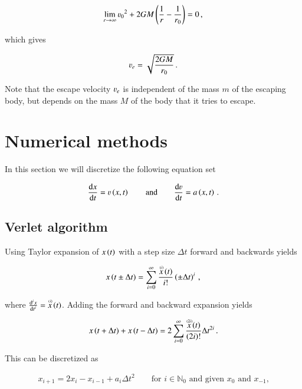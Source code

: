 \documentclass[11pt,english,a4paper]{article}
\begin{document}
\begin{flushleft}
\begin{align*}
\lim_{r\to \infty}{\varv_0}^2 + 2GM\p{\frac{1}{r}-\frac{1}{r_0}} = 0 \,, 
\end{align*}

which gives

\begin{align}
\varv_e = \sqrt{\frac{2GM}{r_0}}\,.
\label{eq_2}
\end{align}

Note that the escape velocity $\varv_e$ is independent of the mass $m$ of the escaping body, but depends on the mass $M$ of the body that it tries to escape. 

\section{Numerical methods}

In this section we will discretize the following equation set

\begin{align}
\frac{\mathrm{d}x}{\mathrm{d}t} = \varv\p{x,t} \qquad \text{and} \qquad \frac{\mathrm{d}\varv}{\mathrm{d}t} = a\p{x,t} \,.
\label{eq_3}
\end{align}

\subsection{Verlet algorithm}

Using Taylor expansion of $x\p{t}$ with a step size $\Delta t$ forward and backwards yields

\begin{align}
x\p{t\pm\Delta t} = \sum_{i=0}^{\infty} \frac{\T{x}{(i)}\p{t}}{i!}\p{\pm\Delta t}^i \,,
\label{eq_4}
\end{align}

where $\frac{\mathrm{d}^i x}{\mathrm{d}t^i} = \T{x}{(i)}\p{t}$. Adding the forward and backward expansion yields

\begin{align*}
x\p{t+\Delta t} + x\p{t-\Delta t} = 2\sum_{i=0}^{\infty} \frac{\T{x}{(2i)}\p{t}}{(2i)!}\Delta t^{2i} \,.
\end{align*}

This can be discretized as 

\begin{align}
x_{i+1} = 2 x_i - x_{i-1} + a_i \Delta t^2 \qquad \text{for } i\in\mathbb{N}_0 \text{ and given $x_0$ and $x_{-1}$,}
\label{eq_5}
\end{align}


\end{flushleft}
\end{document}
